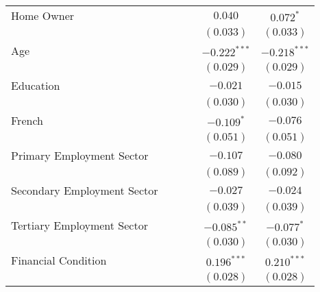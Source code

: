 \begin{center}
\begin{tiny}
\begin{longtable}{l@{} c@{} c@{} c@{} c@{} c@{}}
\quad Home Owner                        &                &                &                & $0.040$          & $0.072^{*}$      \\
                                        &                &                &                & $(0.033)$        & $(0.033)$        \\
\quad Age                               &                &                &                & $-0.222^{***}$   & $-0.218^{***}$   \\
                                        &                &                &                & $(0.029)$        & $(0.029)$        \\
\quad Education                         &                &                &                & $-0.021$         & $-0.015$         \\
                                        &                &                &                & $(0.030)$        & $(0.030)$        \\
\quad French                            &                &                &                & $-0.109^{*}$     & $-0.076$         \\
                                        &                &                &                & $(0.051)$        & $(0.051)$        \\
\quad Primary Employment Sector         &                &                &                & $-0.107$         & $-0.080$         \\
                                        &                &                &                & $(0.089)$        & $(0.092)$        \\
\quad Secondary Employment Sector       &                &                &                & $-0.027$         & $-0.024$         \\
                                        &                &                &                & $(0.039)$        & $(0.039)$        \\
\quad Tertiary Employment Sector        &                &                &                & $-0.085^{**}$    & $-0.077^{*}$     \\
                                        &                &                &                & $(0.030)$        & $(0.030)$        \\
\quad Financial Condition               &                &                &                & $0.196^{***}$    & $0.210^{***}$    \\
                                        &                &                &                & $(0.028)$        & $(0.028)$        \\

\end{longtable}
\end{tiny}
\end{center}

